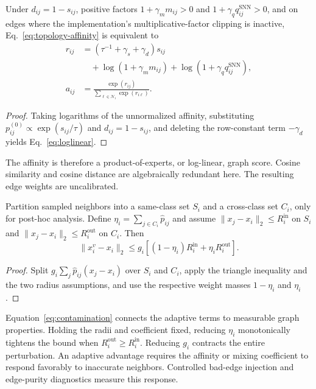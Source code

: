 \begin{proposition}
Under $d_{ij}=1-s_{ij}$, positive factors
$1+\gamma_m m_{ij}>0$ and $1+\gamma_q q_{ij}^{\mathrm{SNN}}>0$, and on edges
where the implementation's multiplicative-factor clipping is inactive,
Eq.~\eqref{eq:topology-affinity} is equivalent to
\begin{align}
 r_{ij}&=(\tau^{-1}+\gamma_s+\gamma_d)s_{ij}\nonumber\\
 &\quad+\log(1+\gamma_m m_{ij})
 +\log(1+\gamma_q q_{ij}^{\mathrm{SNN}}),\nonumber\\
 a_{ij}&=\frac{\exp(r_{ij})}
 {\sum_{\ell\in\mathcal N_i}\exp(r_{i\ell})}.
 \label{eq:loglinear}
\end{align}
\end{proposition}
\begin{proof}
Taking logarithms of the unnormalized affinity, substituting
$p_{ij}^{(0)}\propto\exp(s_{ij}/\tau)$ and $d_{ij}=1-s_{ij}$, and deleting the
row-constant term $-\gamma_d$ yields Eq.~\eqref{eq:loglinear}.
\end{proof}
The affinity is therefore a product-of-experts, or log-linear, graph score.
Cosine similarity and cosine distance are algebraically redundant here. The
resulting edge weights are uncalibrated.

\begin{proposition}
Partition sampled neighbors into a same-class set $S_i$ and a cross-class set
$C_i$, only for post-hoc analysis.  Define
$\eta_i=\sum_{j\in C_i}\widehat p_{ij}$ and assume
$\|x_j-x_i\|_2\leq R_i^{\mathrm{in}}$ on $S_i$ and
$\|x_j-x_i\|_2\leq R_i^{\mathrm{out}}$ on $C_i$.  Then
\begin{equation}
 \|x_i^v-x_i\|_2\leq
 g_i\left[(1-\eta_i)R_i^{\mathrm{in}}+
 \eta_iR_i^{\mathrm{out}}\right].
 \label{eq:contamination}
\end{equation}
\end{proposition}
\begin{proof}
Split $g_i\sum_j\widehat p_{ij}(x_j-x_i)$ over $S_i$ and $C_i$, apply the
triangle inequality and the two radius assumptions, and use the respective
weight masses $1-\eta_i$ and $\eta_i$.
\end{proof}
Equation~\eqref{eq:contamination} connects the adaptive terms to measurable
graph properties. Holding the radii and coefficient fixed, reducing $\eta_i$
monotonically tightens the bound when
$R_i^{\mathrm{out}}\geq R_i^{\mathrm{in}}$. Reducing $g_i$ contracts the
entire perturbation. An adaptive advantage requires the affinity or mixing
coefficient to respond favorably to inaccurate neighbors. Controlled bad-edge
injection and edge-purity diagnostics measure this response.

